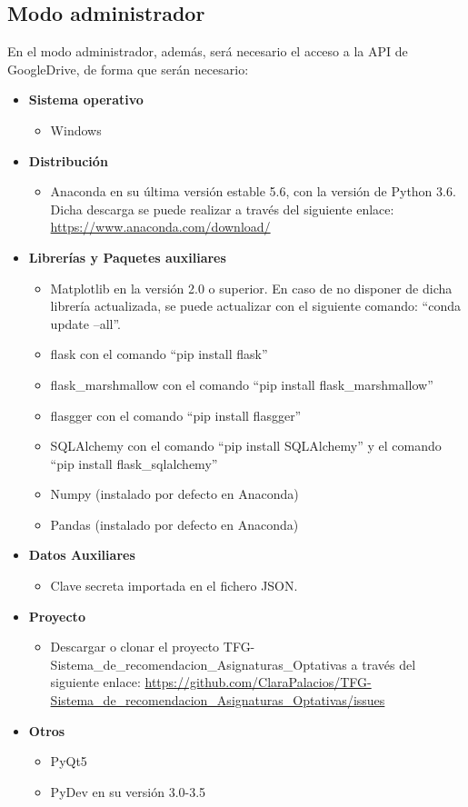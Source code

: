 \subsection{Modo administrador}
En el modo administrador, además, será necesario el acceso a la API de GoogleDrive, de forma que serán necesario: 
\begin{itemize}
\item \textbf{Sistema operativo}
\begin{itemize}
\item Windows
\end{itemize} 
\item \textbf{Distribución}
\begin{itemize}
\item Anaconda en su última versión estable 5.6, con la versión de Python 3.6. Dicha descarga se puede realizar a través del siguiente enlace: \url{https://www.anaconda.com/download/}
\end{itemize}
\item \textbf{Librerías y Paquetes auxiliares}
\begin{itemize}
\item Matplotlib en la versión 2.0 o superior.  En caso de no disponer de dicha librería actualizada, se puede actualizar con el siguiente comando: ``conda update --all''.
\item flask con el comando ``pip install flask''
\item flask\_marshmallow con el comando ``pip install flask\_marshmallow''
\item flasgger con el comando ``pip install flasgger''
\item SQLAlchemy con el comando ``pip install SQLAlchemy'' y el comando ``pip install flask\_sqlalchemy''
\item Numpy (instalado por defecto en Anaconda)
\item Pandas (instalado por defecto en Anaconda)
\end{itemize}
\item \textbf{Datos Auxiliares}
\begin{itemize}
\item Clave secreta importada en el fichero JSON. 
\end{itemize}
\item \textbf{Proyecto}
\begin{itemize}
\item Descargar o clonar el proyecto TFG-Sistema\_de\_recomendacion\_Asignaturas\_Optativas a través del siguiente enlace: \url{https://github.com/ClaraPalacios/TFG-Sistema_de_recomendacion_Asignaturas_Optativas/issues}
\end{itemize}
\item \textbf{Otros}
\begin{itemize}
\item PyQt5
\item PyDev en su versión 3.0-3.5
\end{itemize}
\end{itemize}

